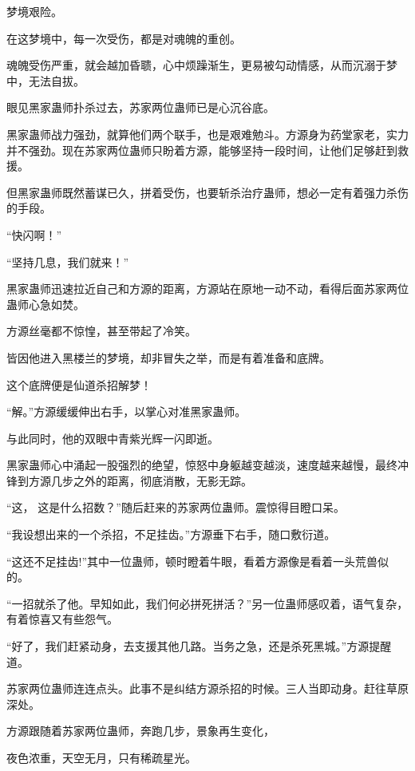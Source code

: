 
\begin{this_body}



梦境艰险。

在这梦境中，每一次受伤，都是对魂魄的重创。

魂魄受伤严重，就会越加昏聩，心中烦躁渐生，更易被勾动情感，从而沉溺于梦中，无法自拔。

眼见黑家蛊师扑杀过去，苏家两位蛊师已是心沉谷底。

黑家蛊师战力强劲，就算他们两个联手，也是艰难勉斗。方源身为药堂家老，实力并不强劲。现在苏家两位蛊师只盼着方源，能够坚持一段时间，让他们足够赶到救援。

但黑家蛊师既然蓄谋已久，拼着受伤，也要斩杀治疗蛊师，想必一定有着强力杀伤的手段。

“快闪啊！”

“坚持几息，我们就来！”

黑家蛊师迅速拉近自己和方源的距离，方源站在原地一动不动，看得后面苏家两位蛊师心急如焚。

方源丝毫都不惊惶，甚至带起了冷笑。

皆因他进入黑楼兰的梦境，却非冒失之举，而是有着准备和底牌。

这个底牌便是仙道杀招解梦！

“解。”方源缓缓伸出右手，以掌心对准黑家蛊师。

与此同时，他的双眼中青紫光辉一闪即逝。

黑家蛊师心中涌起一股强烈的绝望，惊怒中身躯越变越淡，速度越来越慢，最终冲锋到方源几步之外的距离，彻底消散，无影无踪。

“这， 这是什么招数？”随后赶来的苏家两位蛊师。震惊得目瞪口呆。

“我设想出来的一个杀招，不足挂齿。”方源垂下右手，随口敷衍道。

“这还不足挂齿!”其中一位蛊师，顿时瞪着牛眼，看着方源像是看着一头荒兽似的。

“一招就杀了他。早知如此，我们何必拼死拼活？”另一位蛊师感叹着，语气复杂，有着惊喜又有些怨气。

“好了，我们赶紧动身，去支援其他几路。当务之急，还是杀死黑城。”方源提醒道。

苏家两位蛊师连连点头。此事不是纠结方源杀招的时候。三人当即动身。赶往草原深处。

方源跟随着苏家两位蛊师，奔跑几步，景象再生变化，

夜色浓重，天空无月，只有稀疏星光。


\end{this_body}
